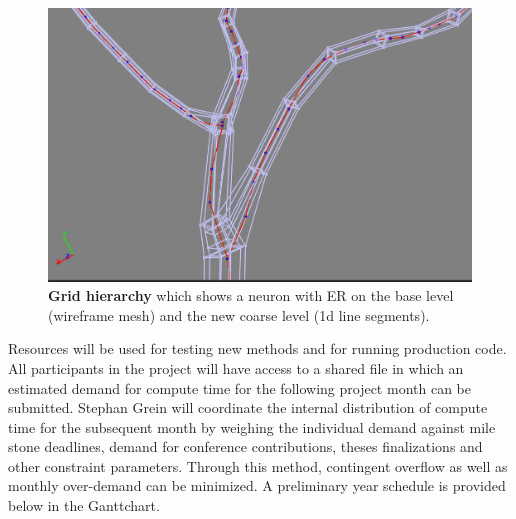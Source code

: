 \begin{figure}[!h]
\centering
\includegraphics[scale=0.20]{inc/img/mesh.png}
\caption{\textbf{Grid hierarchy} which shows a neuron with ER on the base level
 (wireframe mesh) and the new coarse level (1d line segments).}
\label{fig:base_level}
\end{figure}

Resources will be used for testing new methods and for running production code. All participants in the project will have access to a shared file in which an estimated demand for compute time for the following project month can be submitted. Stephan Grein will coordinate the internal distribution of compute time for the subsequent month by weighing the individual demand against mile stone deadlines, demand for conference contributions, theses finalizations and other constraint parameters. Through this method, contingent overflow as well as monthly over-demand can be minimized. A preliminary year schedule is provided below in the Ganttchart.

